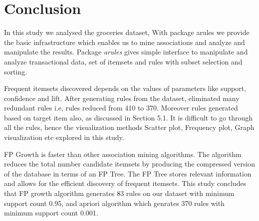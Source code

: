 \documentclass{article}\usepackage[]{graphicx}\usepackage[]{color}
\begin{document}
\section{Conclusion}\hspace{0.9cm} In this study we analysed the groceries dataset, With package arules we provide the basic infrastructure which enables us to mine associations and analyze and manipulate the results. Package \textit{arules} gives simple interface to manipulate and analyze transactional data, set of itemsets and rules with subset selection and sorting.\par
\hspace{0.5cm} Frequent itemsets discovered depends on the values of parameters like support, confidence and lift. After generating rules from the dataset, eliminated many redundant rules i.e, rules reduced from 410 to 370. Moreover rules generated based on target item also, as discussed in Section 5.1. It is difficult to go through all the rules, hence the visualization methods Scatter plot, Frequency plot, Graph visualization etc explored in this study.\par
\hspace{0.5cm}FP Growth is faster than other association mining algorithms. The algorithm reduces the total number candidate itemsets by producing the compressed version of the database in terms of an FP Tree. The FP Tree stores relevant information and allows for the efficient discovery of frequent itemsets. This study concludes that FP growth algorithm generates 83 rules on our dataset with minimum support count 0.95, and apriori algorithm which genrates 370 rules with minimum support count 0.001. 




\end{document}
